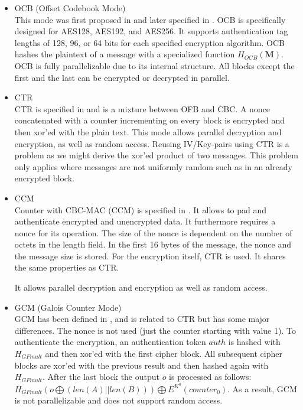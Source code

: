 \begin{itemize}
	\item OCB (Offset Codebook Mode)\\
	      This mode was first proposed in \cite{rogaway2003ocb} and later specified in \cite{krovetz-ocb-04}. OCB is specifically designed for AES128, AES192, and AES256. It supports authentication tag lengths of 128, 96, or 64 bits for each specified encryption algorithm. OCB hashes the plaintext of a message with a specialized function $H_{OCB}(\mathbf{M})$. OCB is fully parallelizable due to its internal structure. All blocks except the first and the last can be encrypted or decrypted in parallel.
	\item CTR\\
	      CTR is specified in \cite{lipmaa2000ctr} and is a mixture between OFB and CBC. A nonce concatenated with a counter incrementing on every block is encrypted and then xor'ed with the plain text. This mode allows parallel decryption and encryption, as well as random access. Reusing IV/Key-pairs using CTR is a problem as we might derive the xor'ed product of two messages. This problem only applies where messages are not uniformly random such as in an already encrypted block.
	\item CCM\\
	      Counter with CBC-MAC (CCM) is specified in \cite{rfc3610}. It allows to pad and authenticate encrypted and unencrypted data. It furthermore requires a nonce for its operation. The size of the nonce is dependent on the number of octets in the length field. In the first 16 bytes of the message, the nonce and the message size is stored. For the encryption itself, CTR is used. It shares the same properties as CTR. 
	
	      It allows parallel decryption and encryption as well as random access.
	\item GCM (Galois Counter Mode)\\
	      GCM has been defined in \cite{mcgrew2004galois}, and is related to CTR but has some major differences. The nonce is not used (just the counter starting with value 1). To authenticate the encryption, an authentication token $auth$ is hashed with $H_{GFmult}$ and then xor'ed with the first cipher block. All subsequent cipher blocks are xor'ed with the previous result and then hashed again with $H_{GFmult}$. After the last block the output $o$ is processed  as follows: $H_{GFmult}(o\bigoplus (len(A)||len(B))) \bigoplus E^{K^0}(counter_0)$. As a result, GCM is not parallelizable and does not support random access.
	

\end{itemize}
